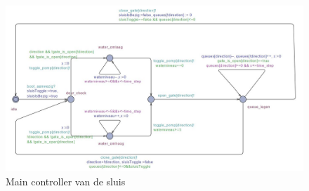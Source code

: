 \documentclass[oneside]{scrbook}
\begin{document}
    \begin{figure}[!h]
    \centering
    \includegraphics[width=1.6\textwidth, angle=90]{Controller.JPG}
    \caption{Main controller van de sluis}
    \label{fig:figure7}
    \end{figure}

\newpage


\end{document}
